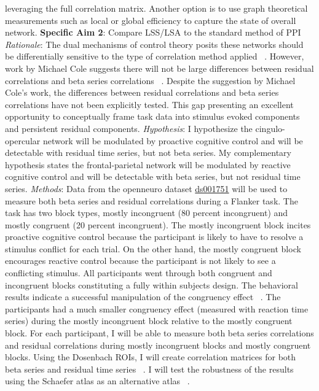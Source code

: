 \documentclass[phd,appendix,figures]{uithesis}
\begin{document}
leveraging the full correlation matrix.
Another option is to use graph theoretical measurements such as local or global efficiency to capture the state of overall network.
\newline
\newline
\textbf{Specific Aim 2}: Compare LSS/LSA to the standard method of PPI
\newline
\newline
\textit{Rationale}: The dual mechanisms of control theory posits these networks should be differentially sensitive to the type of correlation method applied ~\citep{Dosenbach2007,Braver2006}.
However, work by Michael Cole suggests there will not be large differences between residual correlations and beta series correlations ~\citep{Cole2019}.
Despite the suggestion by Michael Cole's work, the differences between residual correlations and beta series correlations have not been explicitly tested.
This gap presenting an excellent opportunity to conceptually frame task data into stimulus evoked components and persistent residual components.
\newline
\newline
\textit{Hypothesis}:
I hypothesize the cingulo-opercular network will be modulated by proactive cognitive control and will be detectable with residual time series, but not beta series.
My complementary hypothesis states the frontal-parietal network will be modulated by reactive cognitive control and will be detectable with beta series, but not residual time series. 
\newline
\newline
\textit{Methods}:
Data from the openneuro dataset \href{https://openneuro.org/datasets/ds001751/versions/1.0.0}{ds001751} will be used to measure both beta series and residual correlations during a Flanker task.
The task has two block types, mostly incongruent (80 percent incongruent) and mostly congruent (20 percent incongruent).
The mostly incongruent block incites proactive cognitive control because the participant is likely to have to resolve a stimulus conflict for each trial.
On the other hand, the mostly congruent block encourages reactive control because the participant is not likely to see a conflicting stimulus.
All participants went through both congruent and incongruent blocks constituting a fully within subjects design.
The behavioral results indicate a successful manipulation of the congruency effect ~\citep{Aben2019}.
The participants had a much smaller congruency effect (measured with reaction time series) during the mostly incongruent block relative to the mostly congruent block.
For each participant, I will be able to measure both beta series correlations and residual correlations during mostly incongruent blocks and mostly congruent blocks. 
Using the Dosenbach ROIs, I will create correlation matrices for both beta series and residual time series ~\citep{Dosenbach2010}.
I will test the robustness of the results using the Schaefer atlas as an alternative atlas ~\citep{schaefer2017}.
\end{document}
